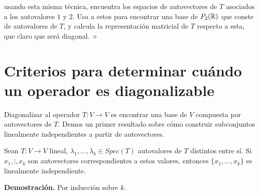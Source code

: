 \begin{ejem}
 usando esta misma técnica, encuentra los 
espacios de autovectores de $T$ asociados a los autovalores 
$1$ y $2$. Usa a estos para encontrar una base de $P_{2}(\mathbb{R})$
que conste de autovalores de $T$, y calcula la representación 
matricial de $T$ respecto a esta, que claro que será diagonal.
$\diamond$
\end{ejem}



\section{Criterios para determinar cuándo un operador es diagonalizable}
Diagonalizar al operador $T: V \longrightarrow V$ es encontrar una base
de $V$ compuesta por autovectores de $T$. Demos un primer resultado
sobre cómo construir subconjuntos linealmente independientes a partir
de autovectores.
\begin{prop}
	\label{prop: autov con distinto autovalor son li}
	Sean $T: V \longrightarrow V$ lineal, $\lambda_{1}, \ldots , \lambda_{k}
	\in Spec(T)$ autovalores de $T$ distintos entre sí. Si
	$x_{1}, \vdots , x_{k}$ son autovectores correspondientes a estos 
	valores, entonces $\{x_{1}, \ldots , x_{k}\}$ es linealmente 
	independiente.
\end{prop}
\textbf{Demostración.}
Por inducción sobre $k$.
